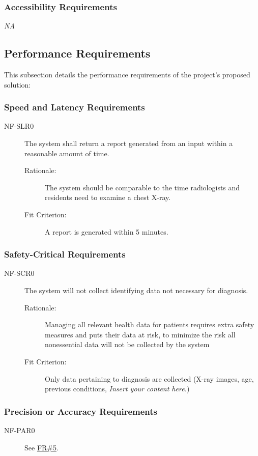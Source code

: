 \documentclass[12pt]{article}
\newcommand{\lips}{\textit{Insert your content here.}}
\begin{document}
\subsubsection{Accessibility Requirements}
\textit{NA}

\subsection{Performance Requirements}
This subsection details the performance requirements of the project's proposed solution:

\subsubsection{Speed and Latency Requirements}
\begin{description}
    \item[NF-SLR0] The system shall return a report generated from an input within a reasonable amount of time. 
    \begin{description}
        \item[Rationale:] The system should be comparable to the time radiologists and residents need to examine a chest X-ray.  
        \item[Fit Criterion:] A report is generated within 5 minutes.
    \end{description}
\end{description}

\subsubsection{Safety-Critical Requirements}
\begin{description}
    \item[NF-SCR0]The system will not collect identifying data not necessary for diagnosis.
    \begin{description}
        \item[Rationale:] Managing all relevant health data for patients requires extra safety measures and puts their data at risk, to minimize the risk all nonessential data will not be collected by the system
        \item[Fit Criterion:] Only data pertaining to diagnosis are collected (X-ray images, age, previous conditions, \lips)
    \end{description}
\end{description}

\subsubsection{Precision or Accuracy Requirements}
\begin{description}
    \item[NF-PAR0] See \hyperlink{FR5}{FR\#5}.
\end{description}
\end{document}
